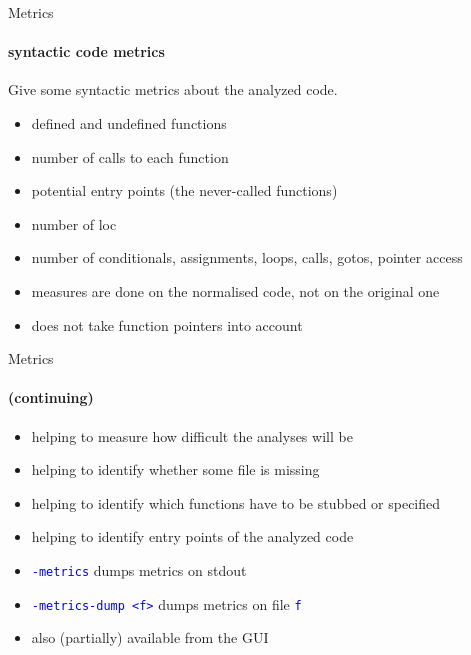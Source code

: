 \documentclass{beamer}
\newcommand{\orange}[1]{{\textcolor{frama-c-1}{#1}}}
\newcommand{\vvert}[1]{{\textcolor{vert}{#1}}}
\newcommand{\bleu}[1]{{\textcolor{blue}{#1}}}
\newcommand{\goup}{\vspace{-5pt}}
\newcommand{\code}[1]{\bleu{\texttt{#1}}}
\newcommand{\continuing}{\framesubtitle{(continuing)}}
\newcommand{\intro}[1]{\begin{center}\vvert{#1}\end{center}}
\newenvironment{sect}[1]{\orange{#1}\begin{itemize}}{\end{itemize}}
\newenvironment{features}{\begin{sect}{Features}}{\end{sect}}
\newenvironment{warnings}{\begin{sect}{Warnings}}{\end{sect}}
\newenvironment{whatitisgoodfor}{\begin{sect}{What is it good for}}{\end{sect}}
\newenvironment{howtouse}{\begin{sect}{How to use}}{\end{sect}}
\begin{document}

\begin{frame}{Metrics}

\framesubtitle{syntactic code metrics}

\goup
\intro{Give some syntactic metrics about the analyzed code.}
\goup

\begin{features}
\item defined and undefined functions
\item number of calls to each function
\item potential entry points (the never-called functions)
\item number of loc
\item number of conditionals, assignments, loops, calls, gotos, pointer access
\end{features}\smallskip

\begin{warnings}
\item measures are done on the normalised code, not on the original one
\item does not take function pointers into account
\end{warnings}

\end{frame}


\begin{frame}{Metrics}
\continuing

\begin{whatitisgoodfor}
\item helping to measure how difficult the analyses will be
\item helping to identify whether some file is missing
\item helping to identify which functions have to be stubbed or specified
\item helping to identify entry points of the analyzed code
\end{whatitisgoodfor}\medskip

\begin{howtouse}
\item \code{-metrics} dumps metrics on stdout
\item \code{-metrics-dump <f>} dumps metrics on file \code{f}
\item also (partially) available from the GUI
\end{howtouse}


\end{frame}
\end{document}
